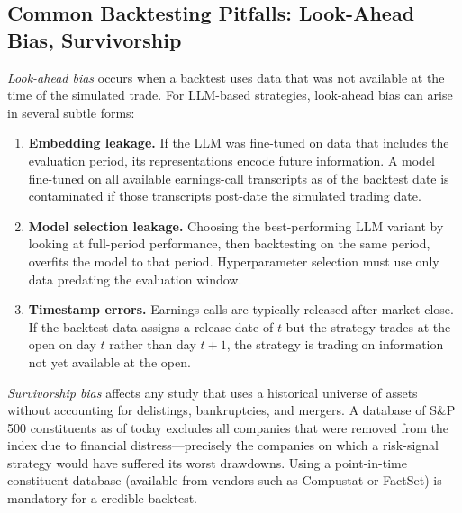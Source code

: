 \subsection{Common Backtesting Pitfalls: Look-Ahead Bias, Survivorship}
\label{sec:ch10-backtesting-pitfalls}

\emph{Look-ahead bias} occurs when a backtest uses data that was not available at the
time of the simulated trade. For LLM-based strategies, look-ahead bias can arise in
several subtle forms:

\begin{enumerate}
  \item \textbf{Embedding leakage.} If the LLM was fine-tuned on data that includes
    the evaluation period, its representations encode future information. A model
    fine-tuned on all available earnings-call transcripts as of the backtest date is
    contaminated if those transcripts post-date the simulated trading date.
  \item \textbf{Model selection leakage.} Choosing the best-performing LLM variant
    by looking at full-period performance, then backtesting on the same period, overfits
    the model to that period. Hyperparameter selection must use only data predating the
    evaluation window.
  \item \textbf{Timestamp errors.} Earnings calls are typically released after market
    close. If the backtest data assigns a release date of $t$ but the strategy trades
    at the open on day $t$ rather than day $t+1$, the strategy is trading on information
    not yet available at the open.
\end{enumerate}

\emph{Survivorship bias} affects any study that uses a historical universe of assets
without accounting for delistings, bankruptcies, and mergers. A database of S\&P 500
constituents as of today excludes all companies that were removed from the index due to
financial distress---precisely the companies on which a risk-signal strategy would have
suffered its worst drawdowns. Using a point-in-time constituent database (available from
vendors such as Compustat or FactSet) is mandatory for a credible backtest.

